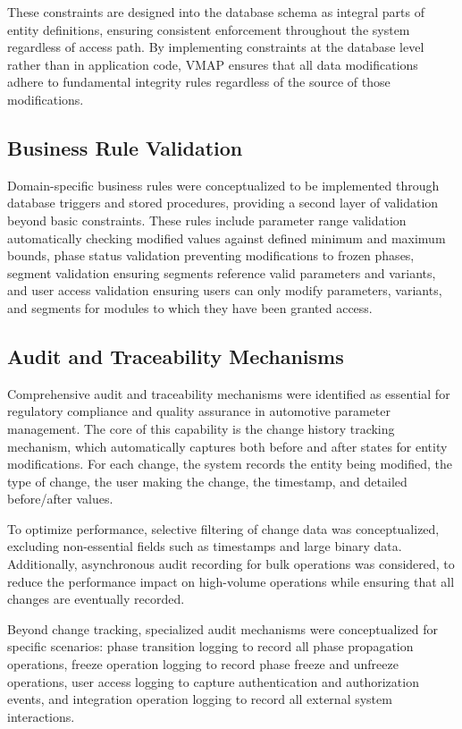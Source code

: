 These constraints are designed into the database schema as integral parts of entity definitions, ensuring consistent enforcement throughout the system regardless of access path. By implementing constraints at the database level rather than in application code, \ac{VMAP} ensures that all data modifications adhere to fundamental integrity rules regardless of the source of those modifications.

\subsection{Business Rule Validation}
\label{subsec:business-rule-validation}

Domain-specific business rules were conceptualized to be implemented through database triggers and stored procedures, providing a second layer of validation beyond basic constraints. These rules include parameter range validation automatically checking modified values against defined minimum and maximum bounds, phase status validation preventing modifications to frozen phases, segment validation ensuring segments reference valid parameters and variants, and user access validation ensuring users can only modify parameters, variants, and segments for modules to which they have been granted access.

\subsection{Audit and Traceability Mechanisms}
\label{subsec:audit-mechanisms}

Comprehensive audit and traceability mechanisms were identified as essential for regulatory compliance and quality assurance in automotive parameter management. The core of this capability is the change history tracking mechanism, which automatically captures both before and after states for entity modifications. For each change, the system records the entity being modified, the type of change, the user making the change, the timestamp, and detailed before/after values.

To optimize performance, selective filtering of change data was conceptualized, excluding non-essential fields such as timestamps and large binary data. Additionally, asynchronous audit recording for bulk operations was considered, to reduce the performance impact on high-volume operations while ensuring that all changes are eventually recorded.

Beyond change tracking, specialized audit mechanisms were conceptualized for specific scenarios: phase transition logging to record all phase propagation operations, freeze operation logging to record phase freeze and unfreeze operations, user access logging to capture authentication and authorization events, and integration operation logging to record all external system interactions.